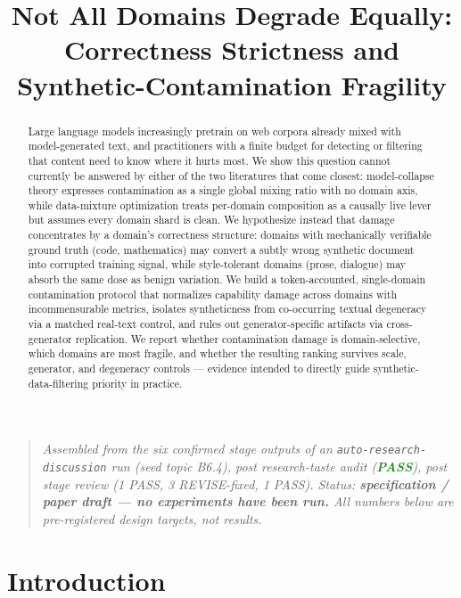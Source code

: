 \documentclass[11pt]{article}
\title{\textbf{Not All Domains Degrade Equally:\\ Correctness Strictness and Synthetic-Contamination Fragility}}
\author{}
\date{}
\begin{document}
\maketitle
\vspace{-2em}

\begin{quote}
\small\textit{Assembled from the six confirmed stage outputs of an \texttt{auto-research-discussion} run (seed topic B6.4), post research-taste audit (\textcolor{ForestGreen}{\textbf{PASS}}), post stage review (1 PASS, 3 REVISE-fixed, 1 PASS). Status: \textbf{specification / paper draft --- no experiments have been run.} All numbers below are pre-registered design targets, not results.}
\end{quote}

\begin{abstract}
Large language models increasingly pretrain on web corpora already mixed with model-generated text, and practitioners with a finite budget for detecting or filtering that content need to know where it hurts most. We show this question cannot currently be answered by either of the two literatures that come closest: model-collapse theory expresses contamination as a single global mixing ratio with no domain axis, while data-mixture optimization treats per-domain composition as a causally live lever but assumes every domain shard is clean. We hypothesize instead that damage concentrates by a domain's correctness structure: domains with mechanically verifiable ground truth (code, mathematics) may convert a subtly wrong synthetic document into corrupted training signal, while style-tolerant domains (prose, dialogue) may absorb the same dose as benign variation. We build a token-accounted, single-domain contamination protocol that normalizes capability damage across domains with incommensurable metrics, isolates syntheticness from co-occurring textual degeneracy via a matched real-text control, and rules out generator-specific artifacts via cross-generator replication. We report whether contamination damage is domain-selective, which domains are most fragile, and whether the resulting ranking survives scale, generator, and degeneracy controls --- evidence intended to directly guide synthetic-data-filtering priority in practice.
\end{abstract}

\section{Introduction}
\end{document}
